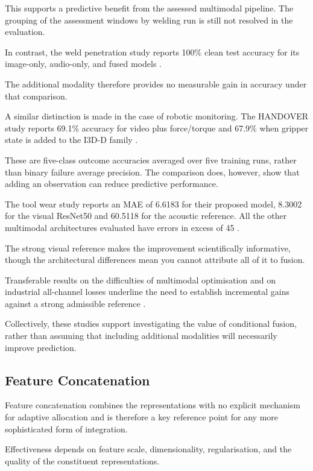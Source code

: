 This supports a predictive benefit from the assessed multimodal pipeline. The grouping of the
assessment windows by welding run is still not resolved in the evaluation.

In contrast, the weld penetration study reports 100\% clean test accuracy for its image-only,
audio-only, and fused models \parencite[Tables~1--3]{Hua2026Weld}.

The additional modality therefore provides no measurable gain in accuracy under that comparison.

A similar distinction is made in the case of robotic monitoring. The HANDOVER study reports 69.1\%
accuracy for video plus force/torque and 67.9\% when gripper state is added to the I3D-D family
\parencite[PDF p.~7, Table~III]{Thoduka2024Handover}.

These are five-class outcome accuracies averaged over five training runs, rather than binary failure
average precision. The comparison does, however, show that adding an observation can reduce
predictive performance.

The tool wear study reports an MAE of 6.6183 for their proposed model, 8.3002 for the visual
ResNet50 and 60.5118 for the acoustic reference. All the other multimodal architectures evaluated
have errors in excess of 45 \parencite[PDF p.~24, Table~1]{P045}.

The strong visual reference makes the improvement scientifically informative, though the
architectural differences mean you cannot attribute all of it to fusion.

Transferable results on the difficulties of multimodal optimisation and on industrial all-channel
losses underline the need to establish incremental gains against a strong admissible reference
\parencite{Wang2020What,Goodarzi2023Deep}.

Collectively, these studies support investigating the value of conditional fusion, rather than
assuming that including additional modalities will necessarily improve prediction.

\subsection{Feature Concatenation}

Feature concatenation combines the representations with no explicit mechanism for adaptive
allocation and is therefore a key reference point for any more sophisticated form of integration.

Effectiveness depends on feature scale, dimensionality, regularisation, and the quality of the
constituent representations.

